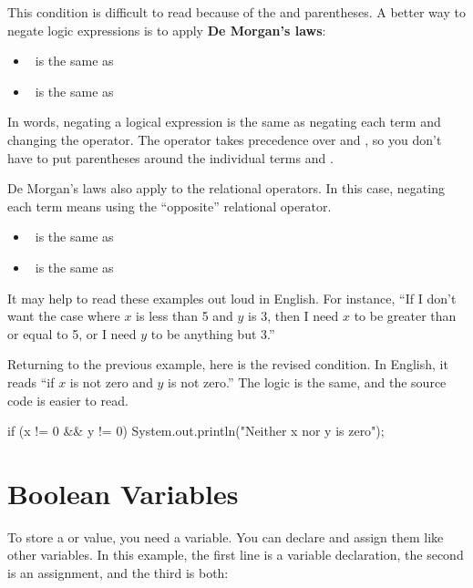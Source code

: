 
This condition is difficult to read because of the \java{!} and parentheses.
A better way to negate logic expressions is to apply {\bf De Morgan's laws}:

\begin{itemize}
\item {} ~is the same as~ 
\item {} ~is the same as~ 
\end{itemize}

In words, negating a logical expression is the same as negating each term and changing the operator.
The \java{!} operator takes precedence over \java{&&} and \java{||}, so you don't have to put parentheses around the individual terms  and .

De Morgan's laws also apply to the relational operators.
In this case, negating each term means using the ``opposite'' relational operator.

\begin{itemize}
\item {} ~is the same as~ 
\item {} ~is the same as~ 
\end{itemize}

It may help to read these examples out loud in English.
For instance, ``If I don't want the case where $x$ is less than 5 and $y$ is 3, then I need $x$ to be greater than or equal to 5, or I need $y$ to be anything but 3.''

Returning to the previous example, here is the revised condition.
In English, it reads ``if $x$ is not zero and $y$ is not zero.''
The logic is the same, and the source code is easier to read.

\begin{code}
if (x != 0 && y != 0) {
    System.out.println("Neither x nor y is zero");
}
\end{code}


\section{Boolean Variables}


To store a  or  value, you need a  variable.
You can declare and assign them like other variables.
In this example, the first line is a variable declaration, the second is an assignment, and the third is both:


